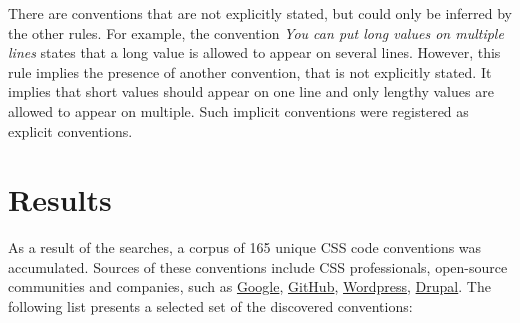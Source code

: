 There are conventions that are not explicitly stated, but could only be inferred by the other rules.
For example, the convention \textit{You can put long values on multiple lines} states that a long
value is allowed to appear on several lines. However, this rule implies the presence of another
convention, that is not explicitly stated. It implies that short values should appear on one line
and only lengthy values are allowed to appear on multiple. Such implicit conventions were registered
as explicit conventions.

\section{Results}

As a result of the searches, a corpus of 165 unique CSS code conventions was accumulated. Sources
of these conventions include CSS professionals, open-source communities and companies, such as \href{https://google-styleguide.googlecode.com/svn/trunk/htmlcssguide.xml#Protocol}{Google}, \href{http://primercss.io/guidelines/#css}{GitHub}, \href{https://make.wordpress.org/core/handbook/best-practices/coding-standards/css/}{Wordpress}, \href{https://www.drupal.org/node/1887862}{Drupal}. The following list presents a selected set of the discovered conventions:

